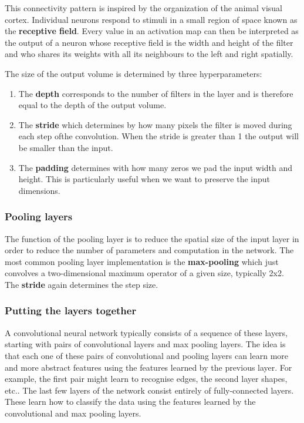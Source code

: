 \documentclass[12pt,a4paper,twoside,openright]{report}
\begin{document}
This connectivity pattern is inspired by the organization of the animal visual cortex. Individual neurons respond to stimuli in a small region of space known as the \textbf{receptive field}. Every value in an activation map can then be interpreted as the output of a neuron whose receptive field is the width and height of the filter and who shares its weights with all its neighbours to the left and right spatially.

The size of the output volume is determined by three hyperparameters:
\begin{enumerate}
	\item The \textbf{depth} corresponds to the number of filters in the layer and is therefore equal to the depth of the output volume.
	\item The \textbf{stride} which determines by how many pixels the filter is moved during each step ofthe convolution. When the stride is greater than 1 the output will be smaller than the input.
	\item The \textbf{padding} determines with how many zeros we pad the input width and height. This is particularly useful when we want to preserve the input dimensions.
\end{enumerate}

\subsubsection{Pooling layers}
The function of the pooling layer is to reduce the spatial size of the input layer in order to reduce the number of parameters and computation in the network. The most common pooling layer implementation is the \textbf{max-pooling} which just convolves a two-dimensional maximum operator of a given size, typically 2x2. The \textbf{stride} again determines the step size.

\subsubsection{Putting the layers together}
A convolutional neural network typically consists of a sequence of these layers, starting with pairs of convolutional layers and max pooling layers. The idea is that each one of these pairs of convolutional and pooling layers can learn more and more abstract features using the features learned by the previous layer. For example, the first pair might learn to recognise edges, the second layer shapes, etc.. The last few layers of the network consist entirely of fully-connected layers. These learn how to classify the data using the features learned by the convolutional and max pooling layers.
\end{document}
